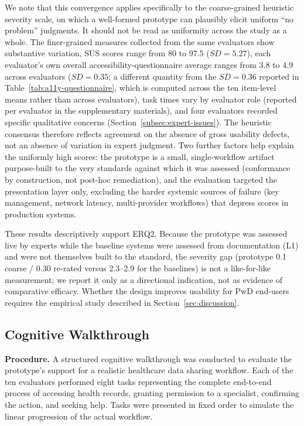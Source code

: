 \documentclass[journal,onecolumn]{IEEEtran}
\begin{document}
We note that this convergence applies specifically to the coarse-grained heuristic severity scale, on which a well-formed prototype can plausibly elicit uniform ``no problem'' judgments. It should not be read as uniformity across the study as a whole. The finer-grained measures collected from the same evaluators show substantive variation, SUS scores range from 80 to 97.5 ($SD = 5.27$), each evaluator's own overall accessibility-questionnaire average ranges from 3.8 to 4.9 across evaluators ($SD = 0.35$; a different quantity from the $SD = 0.36$ reported in Table~\ref{tab:a11y-questionnaire}, which is computed across the ten item-level means rather than across evaluators), task times vary by evaluator role (reported per evaluator in the supplementary materials), and four evaluators recorded specific qualitative concerns (Section~\ref{subsec:expert-issues}). The heuristic consensus therefore reflects agreement on the absence of gross usability defects, not an absence of variation in expert judgment. Two further factors help explain the uniformly high scores: the prototype is a small, single-workflow artifact purpose-built to the very standards against which it was assessed (conformance by construction, not post-hoc remediation), and the evaluation targeted the presentation layer only, excluding the harder systemic sources of failure (key management, network latency, multi-provider workflows) that depress scores in production systems.

These results descriptively support ERQ2. Because the prototype was assessed live by experts while the baseline systems were assessed from documentation (L1) and were not themselves built to the standard, the severity gap (prototype 0.1 coarse / 0.30 re-rated versus 2.3--2.9 for the baselines) is not a like-for-like measurement; we report it only as a directional indication, not as evidence of comparative efficacy. Whether the design improves usability for PwD end-users requires the empirical study described in Section~\ref{sec:discussion}.

\subsection{Cognitive Walkthrough}
\label{subsec:cognitive-walkthrough}

\noindent\textbf{Procedure.} 
A structured cognitive walkthrough was conducted to evaluate the
prototype's support for a realistic healthcare data sharing workflow.
Each of the ten evaluators performed eight tasks representing the
complete end-to-end process of accessing health records, granting
permission to a specialist, confirming the action, and seeking help.
Tasks were presented in fixed order to simulate the linear progression
of the actual workflow.
\end{document}
